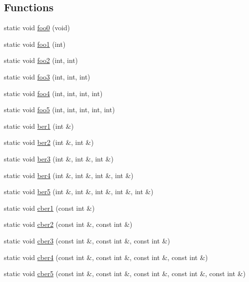 \subsection*{Functions}
\begin{DoxyCompactItemize}
\item 
static void \hyperlink{simulator-test-suite_8cc_afdd6c8c1988df00d7e30a14f32f07845}{foo0} (void)
\item 
static void \hyperlink{simulator-test-suite_8cc_ad9aed34d1c8c83892bdaac80402a1b53}{foo1} (int)
\item 
static void \hyperlink{simulator-test-suite_8cc_a798d379257c4510a9ccfaac52d7e0215}{foo2} (int, int)
\item 
static void \hyperlink{simulator-test-suite_8cc_a24b67dde65f92c9a2bb25a5a4927058a}{foo3} (int, int, int)
\item 
static void \hyperlink{simulator-test-suite_8cc_a7097d5ffd6e0a4900d468e3948c38ef6}{foo4} (int, int, int, int)
\item 
static void \hyperlink{simulator-test-suite_8cc_abbfa04b73da133d2261469da22491bb8}{foo5} (int, int, int, int, int)
\item 
static void \hyperlink{simulator-test-suite_8cc_ab7631fd281d604065e49de75d8702393}{ber1} (int \&)
\item 
static void \hyperlink{simulator-test-suite_8cc_afd59b4263bbd81c9fb5fbd1a2f286d25}{ber2} (int \&, int \&)
\item 
static void \hyperlink{simulator-test-suite_8cc_a51a2766f65adfe161c85945d0a259574}{ber3} (int \&, int \&, int \&)
\item 
static void \hyperlink{simulator-test-suite_8cc_a2ddd2b39f2ace879bf107f5be6c1959b}{ber4} (int \&, int \&, int \&, int \&)
\item 
static void \hyperlink{simulator-test-suite_8cc_a1b842995cae6f7fc1e071e478ee010ce}{ber5} (int \&, int \&, int \&, int \&, int \&)
\item 
static void \hyperlink{simulator-test-suite_8cc_a3cb3b29a959f3625f488d8eefd4e5e18}{cber1} (const int \&)
\item 
static void \hyperlink{simulator-test-suite_8cc_a95371c9e077188f65ffc1b0b5ca3cef9}{cber2} (const int \&, const int \&)
\item 
static void \hyperlink{simulator-test-suite_8cc_a69f284b46270eaf7d9953e897cdf792d}{cber3} (const int \&, const int \&, const int \&)
\item 
static void \hyperlink{simulator-test-suite_8cc_a9cb6715e01142fdeec22f20f5fd3054c}{cber4} (const int \&, const int \&, const int \&, const int \&)
\item 
static void \hyperlink{simulator-test-suite_8cc_a3952c50ae062962a8929b3d8572f086e}{cber5} (const int \&, const int \&, const int \&, const int \&, const int \&)
\end{DoxyCompactItemize}
